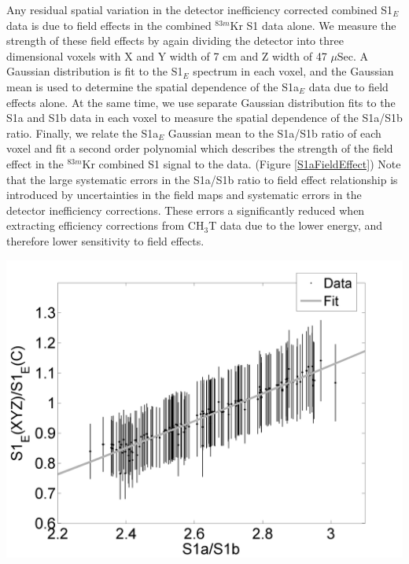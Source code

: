 Any residual spatial variation in the detector inefficiency corrected combined S1$_E$ data is due to field effects in the combined $^{83m}$Kr S1 data alone.  We measure the strength of these field effects by again dividing the detector into three dimensional voxels with X and Y width of 7 cm and Z width of 47 $\mu$Sec.  A Gaussian distribution is fit to the S1$_E$ spectrum in each voxel, and the Gaussian mean is used to determine the spatial dependence of the S1a$_E$ data due to field effects alone.  At the same time, we use separate Gaussian distribution fits to the S1a and S1b data in each voxel to measure the spatial dependence of the S1a/S1b ratio.  Finally, we relate the S1a$_E$ Gaussian mean to the S1a/S1b ratio of each voxel and fit a second order polynomial which describes the strength of the field effect in the $^{83m}$Kr combined S1 signal to the data. (Figure \ref{S1aFieldEffect}) Note that the large systematic errors in the S1a/S1b ratio to field effect relationship is introduced by uncertainties in the field maps and systematic errors in the detector inefficiency corrections.  These errors a significantly reduced when extracting efficiency corrections from CH$_3$T data due to the lower energy, and therefore lower sensitivity to field effects.

\begin{minipage}{8.15cm}
\begin{center}
\includegraphics[scale=0.4]{Run04Corrections/MatthewS1FieldEffectMeasurement.png}
\label{S1aFieldEffect}
\end{center}
\end{minipage}

